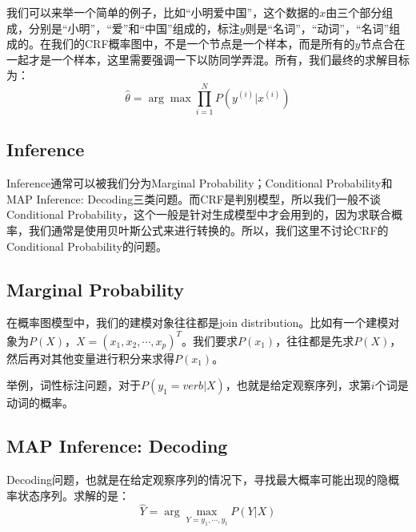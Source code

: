 \documentclass[a4paper]{article}
\begin{document}
我们可以来举一个简单的例子，比如“小明爱中国”，这个数据的$x$由三个部分组成，分别是“小明”，“爱”和“中国”组成的，标注$y$则是“名词”，“动词”，“名词”组成的。在我们的CRF概率图中，不是一个节点是一个样本，而是所有的$y$节点合在一起才是一个样本，这里需要强调一下以防同学弄混。所有，我们最终的求解目标为：
\begin{equation}
    \hat{\theta} = \arg\max \prod_{i=1}^N P(y^{(i)}|x^{(i)})
\end{equation}

\subsection{Inference}
Inference通常可以被我们分为Marginal Probability；Conditional Probability和MAP Inference: Decoding三类问题。而CRF是判别模型，所以我们一般不谈Conditional Probability，这个一般是针对生成模型中才会用到的，因为求联合概率，我们通常是使用贝叶斯公式来进行转换的。所以，我们这里不讨论CRF的Conditional Probability的问题。

\subsection{Marginal Probability}
在概率图模型中，我们的建模对象往往都是join distribution。比如有一个建模对象为$P(X)$，$X=(x_1,x_2,\cdots,x_p)^T$。我们要求$P(x_1)$，往往都是先求$P(X)$，然后再对其他变量进行积分来求得$P(x_1)$。

举例，词性标注问题，对于$P(y_1=verb|X)$，也就是给定观察序列，求第$i$个词是动词的概率。


\subsection{MAP Inference: Decoding}
Decoding问题，也就是在给定观察序列的情况下，寻找最大概率可能出现的隐概率状态序列。求解的是：
\begin{equation}
    \hat{Y} = \arg\max_{Y=y_1,\cdots,y_t} P(Y|X)
\end{equation}
\end{document}
